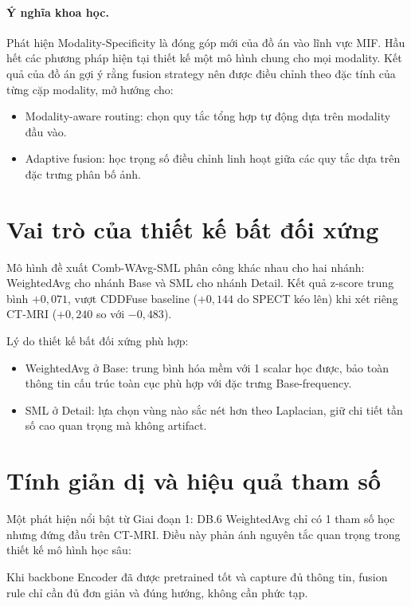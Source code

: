 \paragraph{Ý nghĩa khoa học.}
Phát hiện Modality-Specificity là đóng góp mới của đồ án vào lĩnh vực MIF. Hầu hết các phương pháp hiện tại thiết kế một mô hình chung cho mọi modality. Kết quả của đồ án gợi ý rằng fusion strategy nên được điều chỉnh theo đặc tính của từng cặp modality, mở hướng cho:
\begin{itemize}\itemsep0pt
    \item Modality-aware routing: chọn quy tắc tổng hợp tự động dựa trên modality đầu vào.
    \item Adaptive fusion: học trọng số điều chỉnh linh hoạt giữa các quy tắc dựa trên đặc trưng phân bố ảnh.
\end{itemize}

\section{Vai trò của thiết kế bất đối xứng}
\label{sec:disc-asymmetric}

Mô hình đề xuất Comb-WAvg-SML phân công khác nhau cho hai nhánh: WeightedAvg cho nhánh Base và SML cho nhánh Detail. Kết quả z-score trung bình $+0{,}071$, vượt CDDFuse baseline ($+0{,}144$ do SPECT kéo lên) khi xét riêng CT-MRI ($+0{,}240$ so với $-0{,}483$).

Lý do thiết kế bất đối xứng phù hợp:
\begin{itemize}\itemsep0pt
    \item WeightedAvg ở Base: trung bình hóa mềm với 1 scalar học được, bảo toàn thông tin cấu trúc toàn cục phù hợp với đặc trưng Base-frequency.
    \item SML ở Detail: lựa chọn vùng nào sắc nét hơn theo Laplacian, giữ chi tiết tần số cao quan trọng mà không artifact.
\end{itemize}

\section{Tính giản dị và hiệu quả tham số}
\label{sec:disc-simplicity}

Một phát hiện nổi bật từ Giai đoạn 1: DB.6 WeightedAvg chỉ có 1 tham số học nhưng đứng đầu trên CT-MRI. Điều này phản ánh nguyên tắc quan trọng trong thiết kế mô hình học sâu:

Khi backbone Encoder đã được pretrained tốt và capture đủ thông tin, fusion rule chỉ cần đủ đơn giản và đúng hướng, không cần phức tạp.


